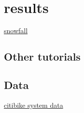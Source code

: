 \documentclass[]{article}
\begin{document}
\section{results}\label{results}

\href{http://CRAN.R-project.org/package=snowfall}{snowfall}

\subsection{Other tutorials}\label{other-tutorials}

\subsection{Data}\label{data-1}

\href{https://www.citibikenyc.com/system-data}{citibike system data}
\end{document}
